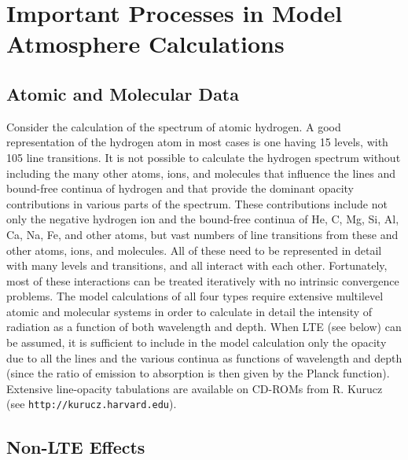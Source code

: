 \documentclass[11pt,twoside]{article}
\begin{document}
\section{Important Processes in Model Atmosphere Calculations}

\subsection{Atomic and Molecular Data}

Consider the calculation of the spectrum of atomic hydrogen.  A
good representation of the hydrogen atom in most cases is one having 15
levels, with 105 line transitions.  It is not possible to calculate the
hydrogen spectrum without including the many other atoms, ions, and
molecules that influence the lines and bound-free continua of hydrogen
and that provide the dominant opacity contributions in various parts of
the spectrum. These contributions include not only the negative hydrogen
ion and the bound-free continua of He, C, Mg, Si, Al, Ca, Na, Fe, and
other atoms, but vast numbers of line transitions from these and other 
atoms, ions, and molecules.  All of these need to be represented in 
detail with many levels and transitions, and all interact with each other.  
Fortunately, most of these interactions can be treated iteratively with
no intrinsic convergence problems.  The model calculations of all 
four types require extensive multilevel atomic and molecular systems
in order to calculate in detail the intensity of radiation as a function
of both wavelength and depth.  When LTE (see below) can be assumed, it is
sufficient to include in the model calculation only the opacity due to
all the lines and the various continua as functions of wavelength and
depth (since the ratio of emission to absorption is then given by the
Planck function). Extensive line-opacity tabulations are available
on CD-ROMs from R. Kurucz (see {\tt http://kurucz.harvard.edu}). 

\subsection{Non-LTE Effects}
\end{document}
